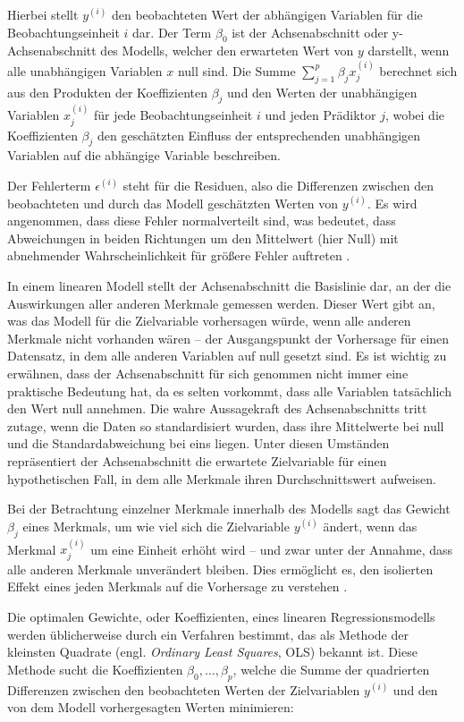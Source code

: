 Hierbei stellt $y^{(i)}$ den beobachteten Wert der abhängigen Variablen für die Beobachtungseinheit
$i$ dar. Der Term $\beta_0$ ist der Achsenabschnitt oder y-Achsenabschnitt des Modells, 
welcher den erwarteten Wert von $y$ darstellt, wenn alle unabhängigen Variablen $x$ null sind. 
Die Summe $\sum_{j=1}^{p} \beta_j x^{(i)}_j$ berechnet sich aus den Produkten der Koeffizienten 
$\beta_j$ und den Werten der unabhängigen Variablen $x^{(i)}_j$ für jede Beobachtungseinheit $i$ 
und jeden Prädiktor $j$, wobei die Koeffizienten $\beta_j$ den geschätzten Einfluss der 
entsprechenden unabhängigen Variablen auf die abhängige Variable beschreiben.

Der Fehlerterm $\epsilon^{(i)}$ steht für die Residuen, also die Differenzen zwischen den beobachteten 
und durch das Modell geschätzten Werten von $y^{(i)}$. Es wird angenommen, dass diese Fehler normalverteilt sind, 
was bedeutet, dass Abweichungen in beiden Richtungen um den Mittelwert (hier Null) 
mit abnehmender Wahrscheinlichkeit für größere Fehler auftreten \cite[S. 37]{Molnar_2022}.

In einem linearen Modell stellt der Achsenabschnitt die Basislinie dar, an der die Auswirkungen aller 
anderen Merkmale gemessen werden. Dieser Wert gibt an, was das Modell für die Zielvariable vorhersagen 
würde, wenn alle anderen Merkmale nicht vorhanden wären – der Ausgangspunkt der Vorhersage 
für einen Datensatz, in dem alle anderen Variablen auf null gesetzt sind. 
Es ist wichtig zu erwähnen, dass der Achsenabschnitt für sich genommen nicht immer eine praktische 
Bedeutung hat, da es selten vorkommt, dass alle Variablen tatsächlich den Wert null annehmen. 
Die wahre Aussagekraft des Achsenabschnitts tritt zutage, wenn die Daten so standardisiert wurden, 
dass ihre Mittelwerte bei null und die Standardabweichung bei eins liegen. Unter diesen Umständen repräsentiert der Achsenabschnitt 
die erwartete Zielvariable für einen hypothetischen Fall, in dem alle Merkmale ihren Durchschnittswert 
aufweisen.

Bei der Betrachtung einzelner Merkmale innerhalb des Modells sagt das Gewicht $\beta_j$ eines Merkmals, 
um wie viel sich die Zielvariable $y^{(i)}$ ändert, wenn das Merkmal $x^{(i)}_j$ um eine Einheit erhöht wird – und zwar unter 
der Annahme, dass alle anderen Merkmale unverändert bleiben. 
Dies ermöglicht es, den isolierten Effekt eines jeden Merkmals auf die Vorhersage zu verstehen \cite[S. 39]{Molnar_2022}.

Die optimalen Gewichte, oder Koeffizienten, eines linearen Regressionsmodells werden üblicherweise durch ein Verfahren bestimmt, 
das als Methode der kleinsten Quadrate (engl. \textit{Ordinary Least Squares}, OLS) bekannt ist. 
Diese Methode sucht die Koeffizienten \( \beta_0, \ldots, \beta_p \), welche die Summe der quadrierten 
Differenzen zwischen den beobachteten Werten der Zielvariablen \( y^{(i)} \) und den von dem Modell 
vorhergesagten Werten minimieren:

